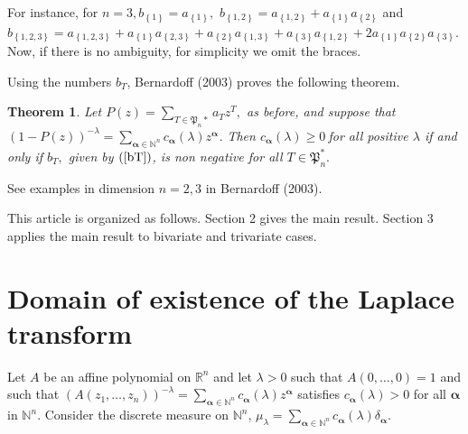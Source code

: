\documentclass[a4paper,oneside,notitlepage]{article}%
\newtheorem{theorem}{Theorem}
\begin{document}
For instance, for $n=3,b_{\left\{  1\right\}  }=a_{\left\{  1\right\}  },$
$b_{\left\{  1,2\right\}  }=a_{\left\{  1,2\right\}  }+a_{\left\{  1\right\}
}a_{\left\{  2\right\}  }$ and $b_{\left\{  1,2,3\right\}  }=a_{\left\{
1,2,3\right\}  }+a_{\left\{  1\right\}  }a_{\left\{  2,3\right\}
}+a_{\left\{  2\right\}  }a_{\left\{  1,3\right\}  }+a_{\left\{  3\right\}
}a_{\left\{  1,2\right\}  }+2a_{\left\{  1\right\}  }a_{\left\{  2\right\}
}a_{\left\{  3\right\}  }$. Now, if there is no ambiguity, for simplicity we
omit the braces.

Using the numbers $b_{T}$, Bernardoff (2003) proves the following theorem.

\begin{theorem}
\label{theoremID}Let $P\left(  z\right)  =%
{\displaystyle\sum\nolimits_{T\in\mathfrak{P}_{n}\ast}}
a_{T}z^{T},$ as before, and suppose that $\left(  1-P\left(  z\right)
\right)  ^{-\lambda}=%
{\displaystyle\sum\nolimits_{\mathbf{\boldsymbol{\alpha}}\in\mathbb{N}^{n}}}
c_{\mathbf{\boldsymbol{\alpha}}}\left(  \lambda\right)
z^{\mathbf{\boldsymbol{\alpha}}}$. Then $c_{\mathbf{\boldsymbol{\alpha}}%
}\left(  \lambda\right)  \geqslant0\ $for all positive $\lambda$ if and only
if $b_{T},$ given by $\left(  \ref{bT}\right)  $, is non negative for all
$T\in\mathfrak{P}_{n}^{\ast}.$
\end{theorem}

See examples in dimension $n=2,3$ in Bernardoff (2003).

This article is organized as follows. Section 2 gives the main result. Section
3 applies the main result to bivariate and trivariate cases.

\section{Domain of existence of the Laplace transform}

Let $A$ be an affine polynomial on $\mathbb{R}^{n}$ and let $\lambda>0$ such
that $A\left(  0,\ldots,0\right)  =1$ and such that $\left(  A\left(
z_{1},\ldots,z_{n}\right)  \right)  ^{-\lambda}=%
{\displaystyle\sum\limits_{\mathbf{\boldsymbol{\alpha}}\in\mathbb{N}^{n}}}
c_{\mathbf{\boldsymbol{\alpha}}}\left(  \lambda\right)
z^{\mathbf{\boldsymbol{\alpha}}}$ satisfies $c_{\mathbf{\boldsymbol{\alpha}}%
}\left(  \lambda\right)  >0$ for all \textbf{$\boldsymbol{\alpha}$} in
$\mathbb{N}^{n}.$ Consider the discrete measure on $\mathbb{N}^{n}$,
$\mu_{\lambda}=%
{\displaystyle\sum\limits_{\mathbf{\boldsymbol{\alpha}}\in\mathbb{N}^{n}}}
c_{\mathbf{\boldsymbol{\alpha}}}\left(  \lambda\right)  \delta
_{\mathbf{\boldsymbol{\alpha}}}$.
\end{document}
